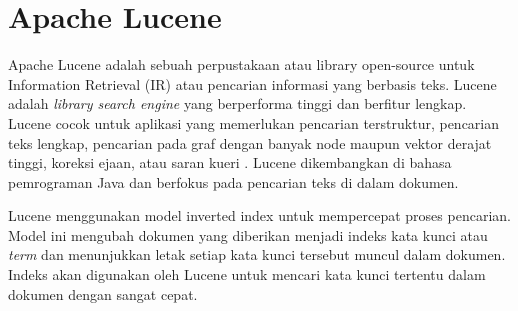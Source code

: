 \section{Apache Lucene}
Apache Lucene adalah sebuah perpustakaan atau library open-source untuk Information Retrieval (IR) atau pencarian informasi yang berbasis teks. Lucene adalah \textit{library search engine} yang berperforma tinggi dan berfitur lengkap. Lucene cocok untuk aplikasi yang memerlukan pencarian terstruktur, pencarian teks lengkap, pencarian pada graf dengan banyak node maupun vektor derajat tinggi, koreksi ejaan, atau saran kueri \parencite{apachelucene}. Lucene dikembangkan di bahasa pemrograman Java dan berfokus pada pencarian teks di dalam dokumen.

Lucene menggunakan model inverted index untuk mempercepat proses pencarian. Model ini mengubah dokumen yang diberikan menjadi indeks kata kunci atau \textit{term} dan menunjukkan letak setiap kata kunci tersebut muncul dalam dokumen. Indeks akan digunakan oleh Lucene untuk mencari kata kunci tertentu dalam dokumen dengan sangat cepat.